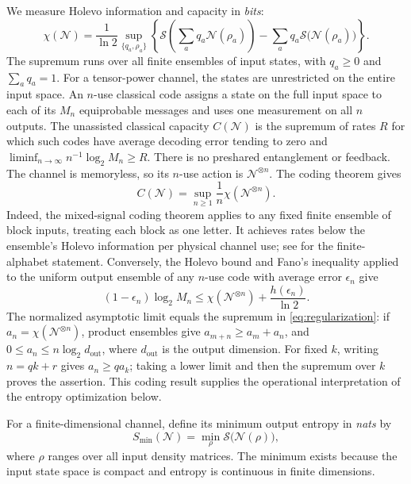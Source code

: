 \documentclass[11pt]{article}
\theoremstyle{remark}
\newcommand{\ent}{\mathcal S}
\numberwithin{equation}{section}
\begin{document}
We measure Holevo information and capacity in \emph{bits}:
\begin{equation}\label{eq:holevo}
 \chi(\mathcal N)=\frac1{\ln2}
 \sup_{\{q_a,\rho_a\}}
 \left\{\ent\!\left(\sum_aq_a\mathcal N(\rho_a)\right)
       -\sum_aq_a\ent\bigl(\mathcal N(\rho_a)\bigr)\right\}.
\end{equation}
The supremum runs over all finite ensembles of input states, with
$q_a\ge0$ and $\sum_aq_a=1$. For a tensor-power channel, the states
are unrestricted on the entire input space. An $n$-use classical code assigns a state on the full input space to
each of its $M_n$ equiprobable messages and uses one measurement on all $n$ outputs.
The unassisted classical capacity $C(\mathcal N)$ is the supremum of
rates $R$ for which such codes have average decoding error tending to
zero and $\liminf_{n\to\infty}n^{-1}\log_2 M_n\ge R$.
There is no preshared entanglement or feedback. The channel is
memoryless, so its $n$-use action is $\mathcal N^{\otimes n}$.
The coding theorem gives
\begin{equation}\label{eq:regularization}
 C(\mathcal N)=\sup_{n\ge1}\frac1n\chi(\mathcal N^{\otimes n}).
\end{equation}
Indeed, the mixed-signal coding theorem
\cite{Holevo1998,SchumacherWestmoreland1997} applies to any fixed finite
ensemble of block inputs, treating each block as one letter. It achieves
rates below the ensemble's Holevo information per physical channel use;
see \cite[preprint, Section~2, Eq.~(5)]{Holevo1998} for the finite-alphabet
statement. Conversely, the Holevo bound and Fano's inequality applied to
the uniform output ensemble of any $n$-use code with average error
$\epsilon_n$ give
\[
 (1-\epsilon_n)\log_2 M_n
 \le \chi(\mathcal N^{\otimes n})+\frac{h(\epsilon_n)}{\ln2}.
\]
The normalized asymptotic limit equals the supremum in
\eqref{eq:regularization}: if $a_n=\chi(\mathcal N^{\otimes n})$,
product ensembles give $a_{m+n}\ge a_m+a_n$, and
$0\le a_n\le n\log_2 d_{\mathrm{out}}$, where $d_{\mathrm{out}}$ is
the output dimension. For fixed $k$, writing $n=qk+r$ gives
$a_n\ge q a_k$; taking a lower limit and then the supremum over $k$
proves the assertion. This coding result supplies the operational
interpretation of the entropy optimization below.

For a finite-dimensional channel, define its minimum output entropy in
\emph{nats} by
\begin{equation}\label{eq:min-output}
 S_{\min}(\mathcal N)=\min_{\rho}\ent\bigl(\mathcal N(\rho)\bigr),
\end{equation}
where $\rho$ ranges over all input density matrices. The minimum exists
because the input state space is compact and entropy is continuous in
finite dimensions.
\end{document}
